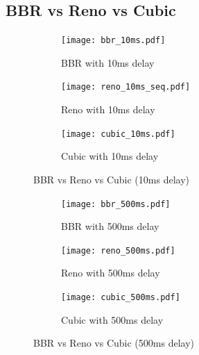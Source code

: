\documentclass{exam}
\begin{document}
\pagebreak
\subsection{BBR vs Reno vs Cubic}
\begin{figure}[H]
    \centering
    \begin{subfigure}{0.40\textwidth}
        \centering
        \texttt{[image: bbr\_10ms.pdf]}
        \caption{BBR with 10ms delay}
    \end{subfigure}
    \begin{subfigure}{0.40\textwidth}
        \centering
        \texttt{[image: reno\_10ms\_seq.pdf]}
        \caption{Reno with 10ms delay}
    \end{subfigure}
    \begin{subfigure}{0.40\textwidth}
        \centering
        \texttt{[image: cubic\_10ms.pdf]}
        \caption{Cubic with 10ms delay}
    \end{subfigure}
    \caption{BBR vs Reno vs Cubic (10ms delay)}
    \label{fig:bbr-reno-cubic-10ms}
\end{figure}
\begin{figure}
    \centering
    \begin{subfigure}{0.40\textwidth}
        \centering
        \texttt{[image: bbr\_500ms.pdf]}
        \caption{BBR with 500ms delay}
    \end{subfigure}
    \begin{subfigure}{0.40\textwidth}
        \centering
        \texttt{[image: reno\_500ms.pdf]}
        \caption{Reno with 500ms delay}
    \end{subfigure}
    \begin{subfigure}{0.40\textwidth}
        \centering
        \texttt{[image: cubic\_500ms.pdf]}
        \caption{Cubic with 500ms delay}
    \end{subfigure}
    \caption{BBR vs Reno vs Cubic (500ms delay)}
    \label{fig:bbr-reno-cubic-500ms}
\end{figure}
\end{document}
